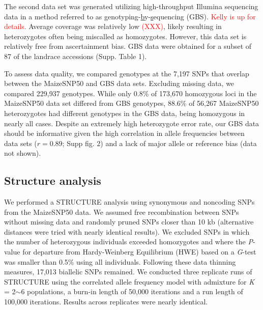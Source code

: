 The second data set was generated utilizing high-throughput Illumina sequencing data in a method referred to as \underline{g}enotyping-\underline{b}y-\underline{s}equencing (GBS).  \textcolor{red}{Kelly is up for details.}
Average coverage was relatively low \textcolor{red}{(XXX)}, likely resulting in heterozygotes often being miscalled as homozygotes.  However, this data set is relatively free from ascertainment bias.       
GBS data were obtained for a subset of 87 of the landrace accessions (Supp. Table 1). 

To assess data quality, we compared genotypes at the 7,197 SNPs that overlap between the MaizeSNP50 and GBS data sets. 
Excluding missing data, we compared 229,937 genotypes. 
While only 0.8\% of 173,670 homozygous loci in the MaizeSNP50 data set differed from GBS genotypes, 88.6\% of 56,267 MaizeSNP50 heterozygotes had different genotypes in the GBS data, being homozygous in nearly all cases. 
Despite an extremely high heterozygote error rate, our GBS data should be informative given the high correlation in allele frequencies between data sets ($r=0.89$; Supp fig. 2) and a lack of major allele or reference bias (data not shown).

\subsection*{Structure analysis}
We performed a {\sf STRUCTURE} analysis \cite[]{Pritchard_2000_10835412,Falush_2003_12930761} using  synonymous and noncoding SNPs from the MaizeSNP50 data. 
We assumed free recombination between SNPs without missing data and randomly pruned SNPs closer than 10 kb (alternative distances were tried with nearly identical results). 
We excluded SNPs in which the number of heterozygous individuals exceeded homozygotes and where the \emph{P}-value for departure from Hardy-Weinberg Equilibrium (HWE) based on a \emph{G}-test was smaller than 0.5\% using all individuals. 
Following these data thinning measures, 17,013 biallelic SNPs remained. 
We conducted three replicate runs of {\sf STRUCTURE} using the correlated allele frequency model with admixture for \emph{K} = 2$\sim$6 populations, a burn-in length of 50,000 iterations and a run length of 100,000 iterations. 
Results across replicates were nearly identical.

